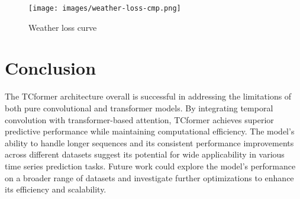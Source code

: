 \documentclass[10pt,journal,compsoc]{IEEEtran}
\begin{document}
\begin{figure}
    \centering
    \texttt{[image: images/weather-loss-cmp.png]}
    \caption{Weather loss curve}
    \label{fig:weather-loss-curve}
\end{figure}



\section{Conclusion}
The TCformer architecture overall is successful in addressing the limitations of both pure convolutional and transformer models. By integrating temporal convolution with transformer-based attention, TCformer achieves superior predictive performance while maintaining computational efficiency. The model's ability to handle longer sequences and its consistent performance improvements across different datasets suggest its potential for wide applicability in various time series prediction tasks. Future work could explore the model's performance on a broader range of datasets and investigate further optimizations to enhance its efficiency and scalability.


\ifCLASSOPTIONcaptionsoff
  \newpage
\fi



\end{document}
